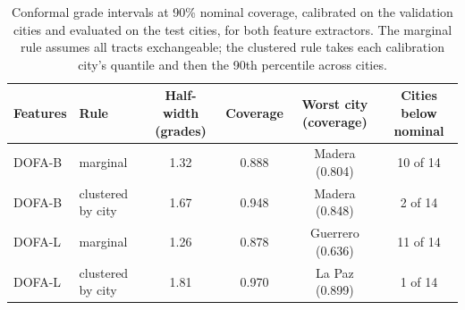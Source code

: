 \begin{table}[htbp]
\centering
\caption{Conformal grade intervals at 90\% nominal coverage, calibrated on the validation cities and evaluated on the test cities, for both feature extractors. The marginal rule assumes all tracts exchangeable; the clustered rule takes each calibration city's quantile and then the 90th percentile across cities.}
\small
\begin{tabular}{llcccc}
\toprule
Features & Rule & Half-width (grades) & Coverage & Worst city (coverage) & Cities below nominal\\
\midrule
DOFA-B & marginal & 1.32 & 0.888 & Madera (0.804) & 10 of 14\\
DOFA-B & clustered by city & 1.67 & 0.948 & Madera (0.848) & 2 of 14\\
DOFA-L & marginal & 1.26 & 0.878 & Guerrero (0.636) & 11 of 14\\
DOFA-L & clustered by city & 1.81 & 0.970 & La Paz (0.899) & 1 of 14\\
\bottomrule
\end{tabular}
\label{tab:conformal}
\end{table}
